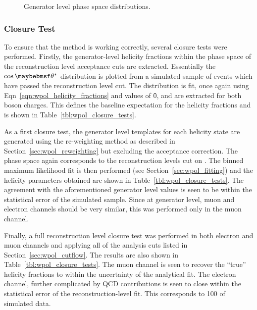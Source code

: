 \begin{figure}
\centering
{}\quad
{}\quad
\caption[Generator level \PW phase space distributions.]{Generator level \PW
  phase space distributions.}
\label{fig:wpol_genreco}
\end{figure}

\subsubsection{Closure Test}
To ensure that the method is working correctly, several closure tests were
performed. Firstly, the generator-level helicity fractions within the phase
space of the reconstruction level \PW acceptance cuts are extracted. Essentially
the $\cos\thetastar$ distribution is plotted from a simulated sample of events
which have passed the reconstruction level \PtW cut. The distribution is fit,
once again using Eqn~\ref{eqn:wpol_helicity_fractions} and values of \f0, \fL and
\fR are extracted for both boson charges. This defines the baseline expectation
for the helicity fractions and is shown in Table~\ref{tbl:wpol_closure_tests}.

As a first closure test, the generator level \LP templates for each helicity
state are generated using the re-weighting method as described in
Section~\ref{sec:wpol_reweighting} but excluding the acceptance correction. The
phase space again corresponds to the reconstruction levels cut on \PtW. The
binned maximum likelihood fit is then performed (see
Section~\ref{sec:wpol_fitting}) and the helicity parameters obtained are shown
in Table~\ref{tbl:wpol_closure_tests}. The agreement with the aforementioned
generator level values is seen to be within the statistical error of the
simulated sample. Since at generator level, muon and electron channels should be
very similar, this was performed only in the muon channel.

Finally, a full reconstruction level closure test was performed in both electron
and muon channels and applying all of the analysis cuts listed in
Section~\ref{sec:wpol_cutflow}. The results are also shown in
Table~\ref{tbl:wpol_closure_tests}. The muon channel is seen to recover the
``true'' helicity fractions to within the uncertainty of the analytical fit. The
electron channel, further complicated by \ac{QCD} contributions is seen to close
within the statistical error of the reconstruction-level fit. This corresponds
to \unit{100}{\invpicobarn} of simulated data.

